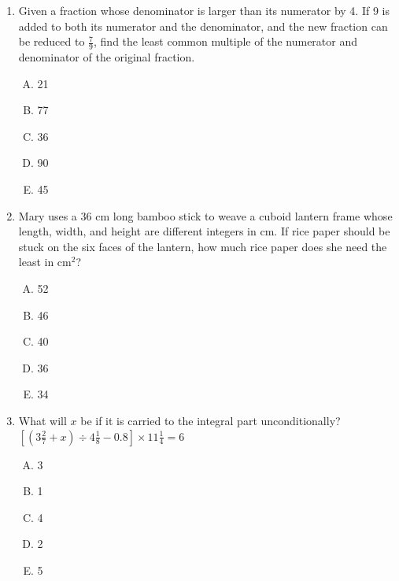 \documentclass[12pt]{scrartcl}
\begin{document}
\begin{enumerate}
    \item Given a fraction whose denominator is larger than its numerator by 4. If 9 is added to both its numerator and the denominator, and the new fraction can be reduced to $\frac{7}{9}$, find the least common multiple of the numerator and denominator of the original fraction.
    \begin{multicols}{5}
        \begin{enumerate}[(A)]
            \item 21
            \item 77
            \item 36
            \item 90
            \item 45
        \end{enumerate}
    \end{multicols}

    \item Mary uses a 36 cm long bamboo stick to weave a cuboid lantern frame whose length, width, and height are different integers in cm. If rice paper should be stuck on the six faces of the lantern, how much rice paper does she need the least in cm$^2$?
    \begin{multicols}{5}
        \begin{enumerate}[(A)]
            \item 52
            \item 46
            \item 40
            \item 36
            \item 34
        \end{enumerate}
    \end{multicols}

    \item What will $x$ be if it is carried to the integral part unconditionally?
    $[(3\frac{2}{7} + x) \div 4\frac{1}{8} - 0.8] \times 11\frac{1}{4} = 6$
    \begin{multicols}{5}
        \begin{enumerate}[(A)]
            \item 3
            \item 1
            \item 4
            \item 2
            \item 5
        \end{enumerate}
    \end{multicols}


\end{enumerate}
\end{document}
